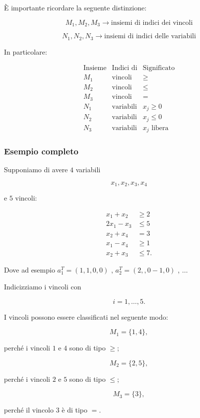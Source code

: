 È importante ricordare la seguente distinzione:

\[
\boxed{
M_1,M_2,M_3
\longrightarrow
\text{insiemi di indici dei vincoli}
}
\]

\[
\boxed{
N_1,N_2,N_3
\longrightarrow
\text{insiemi di indici delle variabili}
}
\]

In particolare:

\[
\begin{array}{c|c|c}
\text{Insieme} & \text{Indici di} & \text{Significato}\\
\hline
M_1 & \text{vincoli} & \ge\\
M_2 & \text{vincoli} & \le\\
M_3 & \text{vincoli} & =\\
\hline
N_1 & \text{variabili} & x_j\ge0\\
N_2 & \text{variabili} & x_j\le0\\
N_3 & \text{variabili} & x_j\text{ libera}
\end{array}
\]

\subsubsection*{Esempio completo}

Supponiamo di avere $4$ variabili

\[
x_1,x_2,x_3,x_4
\]

e $5$ vincoli:

\[
\begin{aligned}
x_1+x_2&\ge2\\
2x_1-x_3&\le5\\
x_2+x_4&=3\\
x_1-x_4&\ge1\\
x_2+x_3&\le7.
\end{aligned}
\]

Dove ad esempio $a_1^T = (1,1,0,0)$ , $a_2^T = (2,,0-1,0)$ , $\dots$


Indicizziamo i vincoli con

\[
i=1,\ldots,5.
\]

I vincoli possono essere classificati nel seguente modo:

\[
M_1=\{1,4\},
\]

perché i vincoli $1$ e $4$ sono di tipo $\ge$;

\[
M_2=\{2,5\},
\]

perché i vincoli $2$ e $5$ sono di tipo $\le$;

\[
M_3=\{3\},
\]

perché il vincolo $3$ è di tipo $=$.

